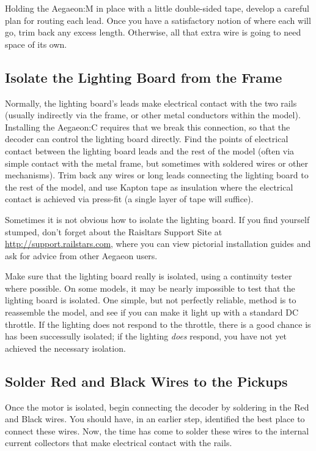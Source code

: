 \documentclass[12pt,letterpaper,draft]{memoir} %
\begin{document}

Holding the Aegaeon:M in place with a little double-sided tape, develop a careful plan for routing each lead. Once you have a satisfactory notion of where each will go, trim back any excess length. Otherwise, all that extra wire is going to need space of its own.

\subsection{Isolate the Lighting Board from the Frame}
Normally, the lighting board's leads make electrical contact with the two rails (usually indirectly via the frame, or other metal conductors within the model). Installing the Aegaeon:C requires that we break this connection, so that the decoder can control the lighting board directly. Find the points of electrical contact between the lighting board leads and the rest of the model (often via simple contact with the metal frame, but sometimes with soldered wires or other mechanisms). Trim back any wires or long leads connecting the lighting board to the rest of the model, and use Kapton tape as insulation where the electrical contact is achieved via press-fit (a single layer of tape will suffice).

Sometimes it is not obvious how to isolate the lighting board. If you find yourself stumped, don't forget about the Raisltars Support Site at \url{http://support.railstars.com}, where you can view pictorial installation guides and ask for advice from other Aegaeon users.

Make sure that the lighting board really is isolated, using a continuity tester where possible. On some models, it may be nearly impossible to test that the lighting board is isolated. One simple, but not perfectly reliable, method is to reassemble the model, and see if you can make it light up with a standard DC throttle. If the lighting does not respond to the throttle, there is a good chance is has been successully isolated; if the lighting \textit{does} respond, you have not yet achieved the necessary isolation.

\subsection{Solder Red and Black Wires to the Pickups}
Once the motor is isolated, begin connecting the decoder by soldering in the Red and Black wires. You should have, in an earlier step, identified the best place to connect these wires. Now, the time has come to solder these wires to the internal current collectors that make electrical contact with the rails.
\end{document}
